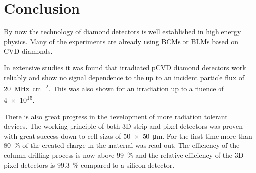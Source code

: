 \section{Conclusion}
By now the technology of diamond detectors is well established in high energy physics. Many of the experiments are already using \acp{BCM} or \acp{BLM} based on \ac{CVD} diamonds.\par
In extensive studies it was found that irradiated \ac{pCVD} diamond detectors work reliably and show no signal dependence to the  up to an incident particle flux of \SI{20}{\mega\hertz\per\centi\meter^2}. This was also shown for an irradiation  up to a fluence of \SI{4e15}{\ncm}.\par
There is also great progress in the development of more radiation tolerant devices. The working principle of both 3D strip and pixel detectors was proven with great success down to cell sizes of \SI{50x50}{\micro\meter}. For the first time more than \SI{80}{\%} of the created charge in the material was read out. The efficiency of the column drilling process is now above \SI{99}{\%} and the relative efficiency of the 3D pixel detectors is \SI{99.3}{\%} compared to a silicon detector.
